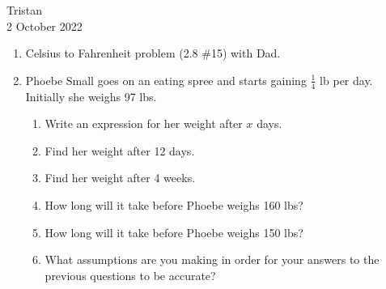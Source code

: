 \documentclass[14pt]{extarticle} %
\begin{document}
\hfill Tristan\\
\null\hfill 2 October 2022

\vspace{10mm}

\begin{enumerate}[label=\Alph*.), itemsep=\fill]
    \item Celsius to Fahrenheit problem (2.8 \#15) with Dad.
    \item  Phoebe Small goes on an eating spree and starts gaining $\frac{1}{4}$ lb per day. Initially she weighs 97 lbs.
    \begin{enumerate}[itemsep=\fill]
        \item Write an expression for her weight after $x$ days.
        \item Find her weight after 12 days.
        \item Find her weight after 4 weeks.
\vfill\clearpage
        \item How long will it take before Phoebe weighs 160 lbs?
        \item How long will it take before Phoebe weighs 150 lbs?
        \item What assumptions are you making in order for your answers to the previous questions to be accurate?
    \end{enumerate}
\vfill\end{enumerate}
\end{document}
